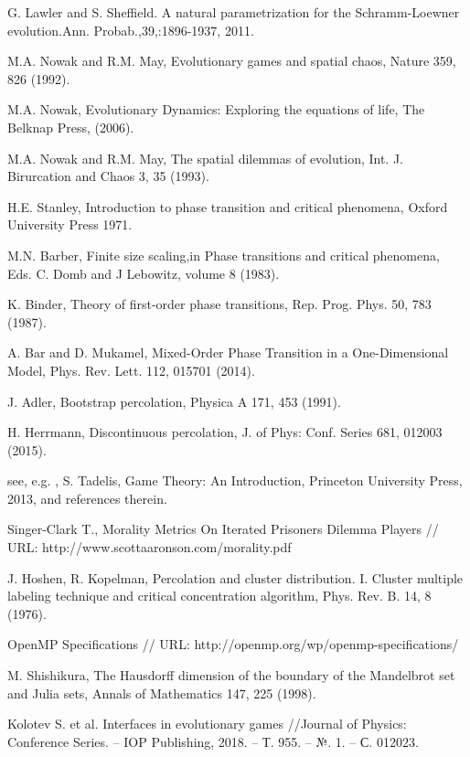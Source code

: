\documentclass[a4paper]{article}
\begin{document}
\begin{thebibliography}{99}
	G. Lawler and S. Sheffield. A natural parametrization for the Schramm-Loewner evolution.Ann. Probab.,39,:1896-1937, 2011.
	
	  M.A. Nowak and R.M. May, Evolutionary games and spatial chaos, Nature 359, 826 (1992).
	
	  M.A. Nowak, Evolutionary Dynamics:  Exploring the equations of life, The Belknap Press, (2006).
	
	  M.A. Nowak and R.M. May, The spatial dilemmas of evolution, Int. J. Birurcation and Chaos 3, 35 (1993).
	
	  H.E. Stanley, Introduction to phase transition and critical phenomena, Oxford University Press 1971.
	
	  M.N. Barber, Finite size scaling,in Phase transitions and critical phenomena, Eds. C. Domb and J Lebowitz, volume 8 (1983).
	
	  K. Binder, Theory of first-order phase transitions, Rep. Prog. Phys. 50, 783 (1987).
	
	  A. Bar and D. Mukamel, Mixed-Order Phase Transition in a One-Dimensional Model, Phys. Rev. Lett. 112, 015701 (2014).
	
	  J. Adler, Bootstrap percolation, Physica A 171, 453 (1991).
	
	  H. Herrmann, Discontinuous percolation, J. of Phys:  Conf. Series 681, 012003 (2015).
	
	  see, e.g. , S. Tadelis, Game Theory:  An Introduction, Princeton University Press, 2013, and references therein.
	
	 Singer-Clark T., Morality Metrics On Iterated Prisoners Dilemma Players // URL: http://www.scottaaronson.com/morality.pdf
	
	  J.  Hoshen,  R.  Kopelman, Percolation  and  cluster  distribution.  I.  Cluster  multiple  labeling  technique  and critical concentration algorithm, Phys. Rev. B. 14, 8 (1976).
	
	  OpenMP Specifications // URL: http://openmp.org/wp/openmp-specifications/
	
	  M.  Shishikura, The  Hausdorff  dimension  of  the  boundary  of  the  Mandelbrot  set  and  Julia  sets,  Annals  of Mathematics 147, 225 (1998).
	
	 Kolotev S. et al. Interfaces in evolutionary games //Journal of Physics: Conference Series. – IOP Publishing, 2018. – Т. 955. – №. 1. – С. 012023.
	
\end{thebibliography}
\end{document}

